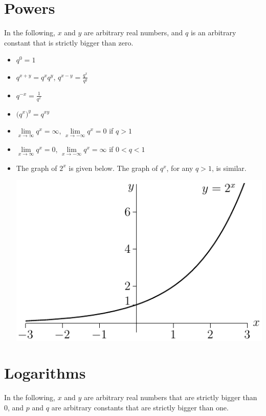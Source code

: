 \section{Powers}\label{sec powers}
In the following, $x$ and $y$ are arbitrary real numbers,
and $q$ is an arbitrary constant that is strictly bigger
than zero.
\begin{itemize}
 \item $q^0=1$

\item $q^{x+y}=q^xq^y$,
         $q^{x-y}=\frac{q^x}{q^y}$
\item $q^{-x}=\frac{1}{q^x}$
\item $\big(q^x\big)^y=q^{xy}$
\item  $\lim\limits_{x\rightarrow\infty}q^x=\infty$,
           $\lim\limits_{x\rightarrow-\infty}q^x=0$ if $q>1$
\item $\lim\limits_{x\rightarrow\infty}q^x=0$,
           $\lim\limits_{x\rightarrow-\infty}q^x=\infty$ if $0<q<1$
\item  The graph of $2^x$ is given below. The graph of  $q^x$,
for any $q>1$, is similar.

\begin{center}
\includegraphics{expGraph2}
\end{center}


\end{itemize}


\section{Logarithms}\label{sec logs}

In the following, $x$ and $y$ are arbitrary real numbers that
are strictly bigger than 0, and
$p$ and $q$ are arbitrary constants that are strictly bigger than one.

